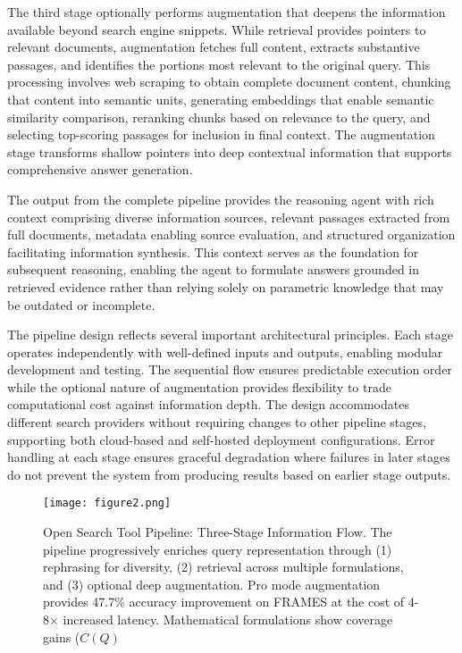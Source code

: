 The third stage optionally performs augmentation that deepens the information available beyond search engine snippets. While retrieval provides pointers to relevant documents, augmentation fetches full content, extracts substantive passages, and identifies the portions most relevant to the original query. This processing involves web scraping to obtain complete document content, chunking that content into semantic units, generating embeddings that enable semantic similarity comparison, reranking chunks based on relevance to the query, and selecting top-scoring passages for inclusion in final context. The augmentation stage transforms shallow pointers into deep contextual information that supports comprehensive answer generation.

The output from the complete pipeline provides the reasoning agent with rich context comprising diverse information sources, relevant passages extracted from full documents, metadata enabling source evaluation, and structured organization facilitating information synthesis. This context serves as the foundation for subsequent reasoning, enabling the agent to formulate answers grounded in retrieved evidence rather than relying solely on parametric knowledge that may be outdated or incomplete.

The pipeline design reflects several important architectural principles. Each stage operates independently with well-defined inputs and outputs, enabling modular development and testing. The sequential flow ensures predictable execution order while the optional nature of augmentation provides flexibility to trade computational cost against information depth. The design accommodates different search providers without requiring changes to other pipeline stages, supporting both cloud-based and self-hosted deployment configurations. Error handling at each stage ensures graceful degradation where failures in later stages do not prevent the system from producing results based on earlier stage outputs.

\begin{figure}[htbp]
    \centering
    \texttt{[image: figure2.png]}
    \caption{Open Search Tool Pipeline: Three-Stage Information Flow. The pipeline progressively enriches query representation through (1) rephrasing for diversity, (2) retrieval across multiple formulations, and (3) optional deep augmentation. Pro mode augmentation provides 47.7\% accuracy improvement on FRAMES at the cost of 4-8$\times$ increased latency. Mathematical formulations show coverage gains ($C(Q)$}
    \label{fig:open_deep_search_architecture}
\end{figure}


